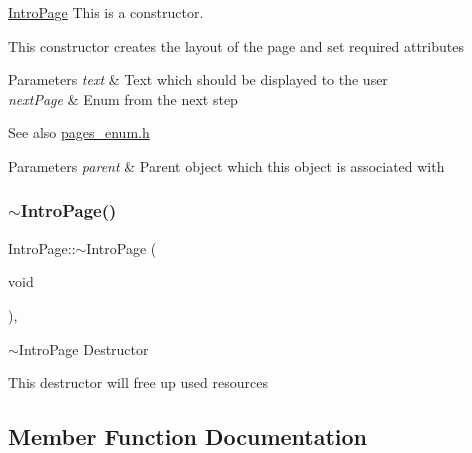 \mbox{\hyperlink{classui_1_1wizard_1_1pages_1_1_intro_page}{Intro\+Page}} This is a constructor. 

This constructor creates the layout of the page and set required attributes 
\begin{DoxyParams}{Parameters}
{\em text} & Text which should be displayed to the user \\
\hline
{\em next\+Page} & Enum from the next step \\
\hline
\end{DoxyParams}
\begin{DoxySeeAlso}{See also}
\mbox{\hyperlink{pages__enum_8h_source}{pages\+\_\+enum.\+h}} 
\end{DoxySeeAlso}

\begin{DoxyParams}{Parameters}
{\em parent} & Parent object which this object is associated with \\
\hline
\end{DoxyParams}
\mbox{\label{classui_1_1wizard_1_1pages_1_1_intro_page_ac83805abea5b47093cc0e3ff4c85abf3}} 
\subsubsection{\texorpdfstring{$\sim$\+Intro\+Page()}{~IntroPage()}}
{\footnotesize\ttfamily Intro\+Page\+::$\sim$\+Intro\+Page (\begin{DoxyParamCaption}\item[{void}]{ }\end{DoxyParamCaption})\hspace{0.3cm}{\ttfamily [override]}, {\ttfamily [virtual]}}



$\sim$\+Intro\+Page Destructor 

This destructor will free up used resources 

\subsection{Member Function Documentation}
\mbox{\label{classui_1_1wizard_1_1pages_1_1_intro_page_a210708d731eaca79e5c0d220c08ad739}} 
